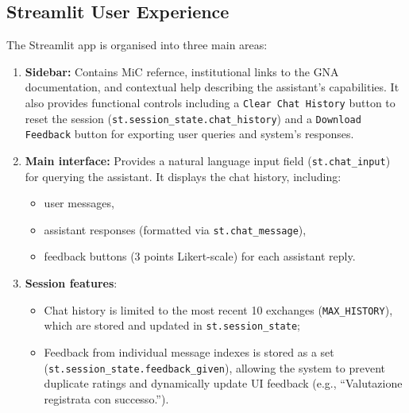 \begin{spacing}{1.5}
\subsection{Streamlit User Experience}
The Streamlit app is organised into three main areas:
\begin{enumerate}
      \item \textbf{Sidebar:} Contains MiC refernce, institutional links to the GNA documentation, and contextual help describing the assistant’s capabilities. It also provides functional controls including a \texttt{Clear Chat History} button to reset the session (\texttt{st.session\_state.chat\_history}) and a \texttt{Download Feedback} button for exporting user queries and system's responses.
      \item \textbf{Main interface:} Provides a natural language input field (\texttt{st.chat\_input}) for querying the assistant. It displays the chat history, including:
      \begin{itemize}
            \item user messages,
            \item assistant responses (formatted via \texttt{st.chat\_message}),
            \item feedback buttons (3 points Likert-scale) for each assistant reply.
      \end{itemize}
      \item \textbf{Session features}: 
      \begin{itemize}
            \item Chat history is limited to the most recent 10 exchanges (\texttt{MAX\_HISTORY}), which are stored and updated in \texttt{st.session\_state};
            \item Feedback from individual message indexes is stored as a set (\texttt{st.session\_state.feedback\_given}), allowing the system to prevent duplicate ratings and dynamically update UI feedback (e.g., ``Valutazione registrata con successo.'').
      \end{itemize}
\end{enumerate}


\end{spacing}
